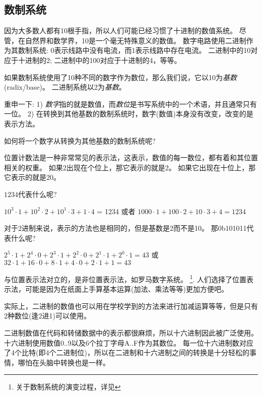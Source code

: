 \subsection{数制系统}

因为大多数人都有10根手指，所以人们可能已经习惯了十进制的数值系统。
尽管，在自然界和数学界，10是一个毫无特殊意义的数值。
数字电路使用二进制作为其数制系统: 0表示线路中没有电流，而1表示线路中存在电流。
二进制中的10对应于十进制的2; 二进制中的100对应于十进制的4，等等。

如果数制系统使用了10种不同的数字作为数位，那么我们说，它以10为\emph{基数}(radix/base)。
二进制系统以2为\emph{基数}。

重申一下:
1) \emph{数字}指的就是数值，而\emph{数位}是书写系统中的一个术语，并且通常只有一位。
2) 在转换到其他基数的数制系统时，数字(数值)本身没有改变，改变的是表示方法。

如何将一个数字从转换为其他基数的数制系统呢?

位置计数法是一种非常常见的表示法，这表示，数值的每一数位，都有着和其位置相关的权重。
如果2出现在个位上，那它表示的就是2。
如果它出现在十位上，那它表示的就是20。

$1234$代表什么呢?

$10^3 \cdot 1 + 10^2 \cdot 2 + 10^1 \cdot 3 + 1 \cdot 4$ = 1234 或者
$1000 \cdot 1 + 100 \cdot 2 + 10 \cdot 3 + 4 = 1234$

对于2进制来说，表示的方法也是相同的，但是基数是2而不是10。
那0b101011代表什么呢?

$2^5 \cdot 1 + 2^4 \cdot 0 + 2^3 \cdot 1 + 2^2 \cdot 0 + 2^1 \cdot 1 + 2^0 \cdot 1 = 43$ 或
$32 \cdot 1 + 16 \cdot 0 + 8 \cdot 1 + 4 \cdot 0 + 2 \cdot 1 + 1 = 43$

与位置表示法对立的，是非位置表示法，如罗马数字系统。
\footnote{关于数制系统的演变过程，详见}.
人们选择了位置表示法，可能是因为在纸面上手算基本运算(加法、乘法等等)更加方便吧。

实际上，二进制的数值也可以用在学校学到的方法来进行加减运算等等，但是只有2种数位(逢2进1)可以使用。

二进制数值在代码和转储数据中的表示都很麻烦，所以十六进制因此被广泛使用。
十六进制使用数值0..9以及6个拉丁字母A..F作为其数位。
每一位十六进制数对应了4个比特(即4个二进制位)，所以在二进制和十六进制之间的转换是十分轻松的事情，哪怕在头脑中转换也是一样。

